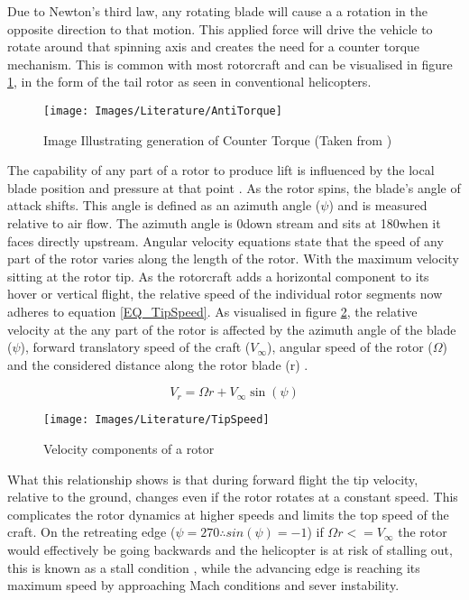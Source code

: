 	Due to Newton's third law, any rotating blade will cause a a rotation in the opposite direction to that motion. This applied force will drive the vehicle to rotate around that spinning axis and creates the need for a counter torque mechanism. This is common with most rotorcraft and can be visualised in figure \ref{IM_Antitorque}, in the form of the tail rotor as seen in conventional helicopters.
	
	\begin{figure}[H]
	\centering
	\texttt{[image: Images/Literature/AntiTorque]}
	\caption{Image Illustrating generation of Counter Torque (Taken from \cite{Heli})}
	\label{IM_Antitorque}
	\end{figure}
	
	The capability of any part of a rotor to produce lift is influenced by the local blade position and pressure at that point \cite{Leishman}.
	As the rotor spins, the blade's angle of attack shifts. This angle is defined as an azimuth angle ($\psi$) and is measured relative to air flow. The azimuth angle is 0\textdegree down stream and sits at 180\textdegree when it faces directly upstream.
	Angular velocity equations state that the speed of any part of the rotor varies along the length of the rotor. With the maximum velocity sitting at the rotor tip. As the rotorcraft adds a horizontal component to its hover or vertical flight, the relative speed of the individual rotor segments now adheres to equation \eqref{EQ_TipSpeed}. As visualised in figure \ref{IM_TipSpeed}, the relative velocity at the any part of the rotor is affected by the azimuth angle of the blade ($\psi$), forward translatory speed of the craft ($V_{\infty}$), angular speed of the rotor ($\Omega$) and the considered distance along the rotor blade (r) \cite{Leishman} \cite{RotorCraftHand}. 
	
	\begin{equation}
	\label{EQ_TipSpeed}
	V_{r} = \Omega r + V_{\infty}\sin(\psi)
	\end{equation}
	
	\begin{figure}[h]
	\centering
	\texttt{[image: Images/Literature/TipSpeed]}
	\caption{Velocity components of a rotor \cite{Leishman}}
	\label{IM_TipSpeed}
	\end{figure}
	
	What this relationship shows is that during forward flight the tip velocity, relative to the ground, changes even if the rotor rotates at a constant speed. This complicates the rotor dynamics at higher speeds and limits the top speed of the craft. On the retreating edge ($\psi = 270$\textdegree $\therefore sin(\psi) = -1$) if $\Omega r <= V_{\infty}$ the rotor would effectively be going backwards and the helicopter is at risk of stalling out, this is known as a stall condition \cite{Leishman} \cite{RotorCraftHand}, while the advancing edge is reaching its maximum speed by approaching Mach conditions and sever instability.

